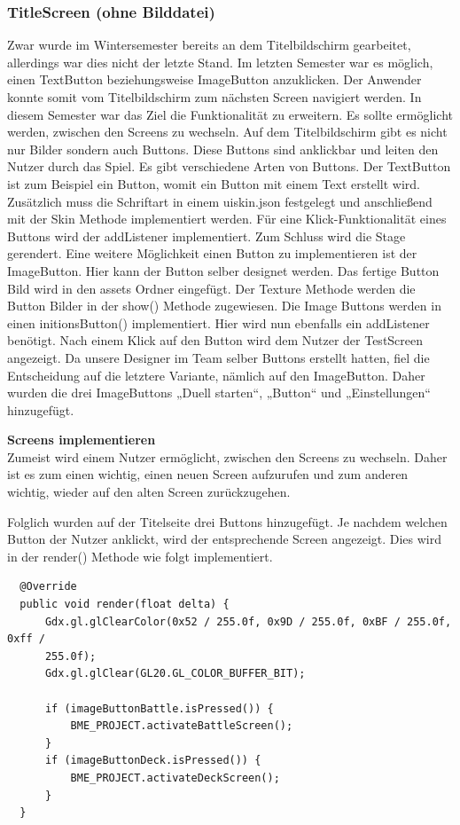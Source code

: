 \subsubsection{TitleScreen (ohne Bilddatei)}
Zwar wurde im Wintersemester bereits an dem Titelbildschirm gearbeitet, allerdings war dies nicht der letzte Stand. Im letzten Semester war es möglich, einen TextButton beziehungsweise ImageButton anzuklicken. Der Anwender konnte somit vom Titelbildschirm zum nächsten Screen navigiert werden. 
In diesem Semester war das Ziel die Funktionalität zu erweitern. 
Es sollte ermöglicht werden, zwischen den Screens zu wechseln. 
Auf dem Titelbildschirm gibt es nicht nur Bilder sondern auch Buttons. Diese Buttons sind anklickbar und leiten den Nutzer durch das Spiel.
Es gibt verschiedene Arten von Buttons. Der TextButton ist zum Beispiel ein Button, womit ein Button mit einem Text erstellt wird. Zusätzlich muss die Schriftart in einem uiskin.json festgelegt und anschließend mit der Skin Methode implementiert werden. 
Für eine Klick-Funktionalität eines Buttons wird der addListener implementiert. Zum Schluss wird die Stage gerendert. 
Eine weitere Möglichkeit einen Button zu implementieren ist der ImageButton. Hier kann der Button selber designet werden. Das fertige Button Bild wird in den assets Ordner eingefügt. Der Texture Methode werden die Button Bilder in der show() Methode zugewiesen. Die Image Buttons werden in einen initionsButton() implementiert. Hier wird nun ebenfalls ein addListener benötigt. Nach einem Klick auf den Button wird dem Nutzer der TestScreen angezeigt. Da unsere Designer im Team selber Buttons erstellt hatten, fiel die Entscheidung auf die letztere Variante, nämlich auf den ImageButton. Daher wurden die drei ImageButtons „Duell starten“, „Button“ und „Einstellungen“ hinzugefügt. 

\textbf{Screens implementieren} \\
Zumeist wird einem Nutzer ermöglicht, zwischen den Screens zu wechseln. Daher ist es zum einen wichtig, einen neuen Screen aufzurufen und zum anderen wichtig, wieder auf den alten Screen zurückzugehen.
  
Folglich wurden auf der Titelseite drei Buttons hinzugefügt.
Je nachdem welchen Button der Nutzer anklickt, wird der entsprechende Screen angezeigt. Dies wird in der render() Methode wie folgt implementiert. 

\begin{lstlisting}
  @Override
  public void render(float delta) {
      Gdx.gl.glClearColor(0x52 / 255.0f, 0x9D / 255.0f, 0xBF / 255.0f, 0xff / 
      255.0f);
      Gdx.gl.glClear(GL20.GL_COLOR_BUFFER_BIT);

      if (imageButtonBattle.isPressed()) {
          BME_PROJECT.activateBattleScreen();
      }
      if (imageButtonDeck.isPressed()) {
          BME_PROJECT.activateDeckScreen();
      }
  }
\end{lstlisting}

